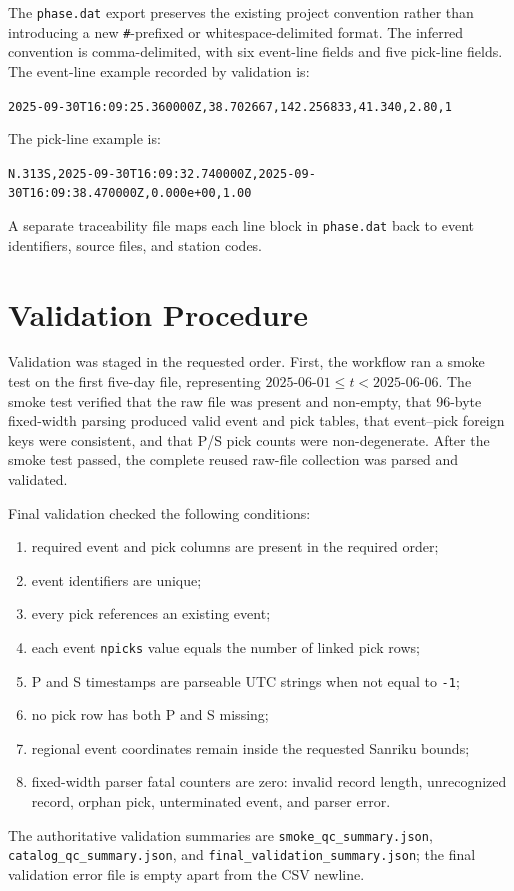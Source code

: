 \documentclass[11pt]{article}
\begin{document}
The \texttt{phase.dat} export preserves the existing project convention rather than introducing a new \texttt{\#}-prefixed or whitespace-delimited format.  The inferred convention is comma-delimited, with six event-line fields and five pick-line fields.  The event-line example recorded by validation is:
\begin{center}
\small\texttt{2025-09-30T16:09:25.360000Z,38.702667,142.256833,41.340,2.80,1}
\end{center}
The pick-line example is:
\begin{center}
\small\texttt{N.313S,2025-09-30T16:09:32.740000Z,2025-09-30T16:09:38.470000Z,0.000e+00,1.00}
\end{center}
A separate traceability file maps each line block in \texttt{phase.dat} back to event identifiers, source files, and station codes.

\section{Validation Procedure}

Validation was staged in the requested order.  First, the workflow ran a smoke test on the first five-day file, representing \(2025\text{-}06\text{-}01 \leq t < 2025\text{-}06\text{-}06\).  The smoke test verified that the raw file was present and non-empty, that 96-byte fixed-width parsing produced valid event and pick tables, that event--pick foreign keys were consistent, and that P/S pick counts were non-degenerate.  After the smoke test passed, the complete reused raw-file collection was parsed and validated.

Final validation checked the following conditions:
\begin{enumerate}
  \item required event and pick columns are present in the required order;
  \item event identifiers are unique;
  \item every pick references an existing event;
  \item each event \texttt{npicks} value equals the number of linked pick rows;
  \item P and S timestamps are parseable UTC strings when not equal to \texttt{-1};
  \item no pick row has both P and S missing;
  \item regional event coordinates remain inside the requested Sanriku bounds;
  \item fixed-width parser fatal counters are zero: invalid record length, unrecognized record, orphan pick, unterminated event, and parser error.
\end{enumerate}
The authoritative validation summaries are \texttt{smoke\_qc\_summary.json}, \texttt{catalog\_qc\_summary.json}, and \texttt{final\_validation\_summary.json}; the final validation error file is empty apart from the CSV newline.
\end{document}
